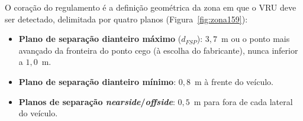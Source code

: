 \documentclass[11pt,a4paper]{article}
\begin{document}
O coração do regulamento é a definição geométrica da zona em que o VRU deve ser
detectado, delimitada por quatro planos (Figura~\ref{fig:zona159}):

\begin{itemize}[leftmargin=1.4em,itemsep=2pt]
  \item \textbf{Plano de separação dianteiro máximo} ($d_{FSP}$): $3{,}7$~m ou
        o ponto mais avançado da fronteira do ponto cego (à escolha do
        fabricante), nunca inferior a $1{,}0$~m.
  \item \textbf{Plano de separação dianteiro mínimo}: $0{,}8$~m à frente do veículo.
  \item \textbf{Planos de separação \emph{nearside}/\emph{offside}}: $0{,}5$~m
        para fora de cada lateral do veículo.
\end{itemize}
\end{document}
